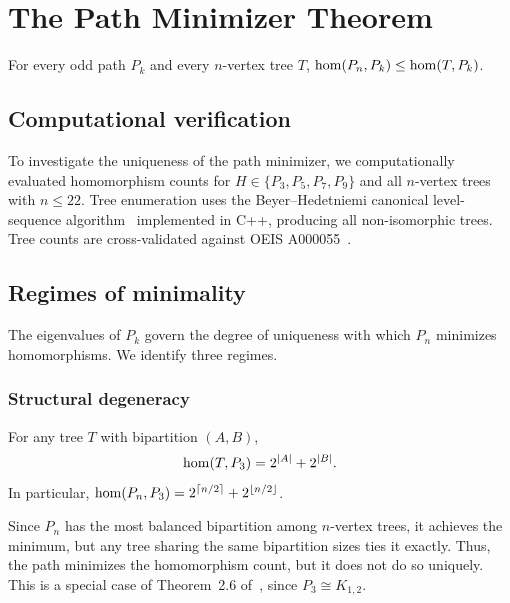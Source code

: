 \section{The Path Minimizer Theorem}
\label{sec:odd-path}

\begin{theorem}
  For every odd path $P_k$ and every $n$-vertex tree $T$,
  $\mathrm{hom}(P_n, P_k) \le \mathrm{hom}(T, P_k)$.
\end{theorem}

\subsection{Computational verification}

To investigate the uniqueness of the path minimizer, we computationally
evaluated homomorphism counts for $H \in \{P_3, P_5, P_7, P_9\}$ and all
$n$-vertex trees with $n \le 22$. Tree enumeration uses the
Beyer--Hedetniemi canonical level-sequence algorithm~\cite{BeyerH80} implemented in C++,
producing all non-isomorphic trees. Tree counts are cross-validated
against OEIS A000055~\cite{oeis_A000055}.

\subsection{Regimes of minimality}

The eigenvalues of $P_k$ govern the degree of uniqueness with
which $P_n$ minimizes homomorphisms. We identify three regimes.

\subsubsection{Structural degeneracy}

\begin{proposition}
  \label{prop:p3}
  For any tree $T$ with bipartition $(A, B)$,
  \[
    \mathrm{hom}(T, P_3) = 2^{|A|} + 2^{|B|}.
  \]
  In particular, $\mathrm{hom}(P_n, P_3) = 2^{\lceil n/2 \rceil}
  + 2^{\lfloor n/2 \rfloor}$.
\end{proposition}

Since $P_n$ has the most balanced bipartition among $n$-vertex trees,
it achieves the minimum, but any tree sharing the same bipartition sizes
ties it exactly. Thus, the path minimizes the homomorphism count, but
it does not do so uniquely. This is a special case of Theorem~2.6
of~\cite{galvin2026}, since $P_3 \cong K_{1,2}$.


